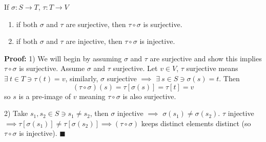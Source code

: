 \begin{lemma}
If $\sigma: S\rightarrow T$, $\tau: T\rightarrow V$
\begin{enumerate}
    \item if both $\sigma$ and $\tau$ are surjective, then $\tau \circ \sigma$ is surjective.
    \item if both $\sigma$ and $\tau$ are injective, then $\tau \circ \sigma$ is injective.
\end{enumerate}
\textbf{Proof:} 1) We will begin by assuming $\sigma$ and $\tau$ are surjective and show this
implies $\tau \circ \sigma$ is surjective. Assume $\sigma$ and $\tau$ surjective. Let $v\in V$,
$\tau$ surjective means $\exists \ t\in T \ni \tau(t)=v $, similarly, $\sigma$ surjective $\implies$
$\exists \ s\in S \ni \sigma(s)=t$. Then
\begin{equation}
    (\tau \circ \sigma)(s)=\tau[\sigma(s)]=\tau[t]=v\nonumber
\end{equation}
so $s$ is a pre-image of $v$ meaning $\tau\circ \sigma$ is also surjective.

2) Take $s_1,s_2\in S \ni s_1\neq s_2$, then $\sigma$ injective $\implies$
$\sigma(s_1)\neq\sigma(s_2)$. $\tau$ injective
$\implies \tau[\sigma(s_1)]\neq \tau[\sigma(s_2)] \implies (\tau \circ \sigma)$ keeps distinct
elements distinct (so $\tau \circ \sigma$ is injective). $\blacksquare$
\end{lemma}


